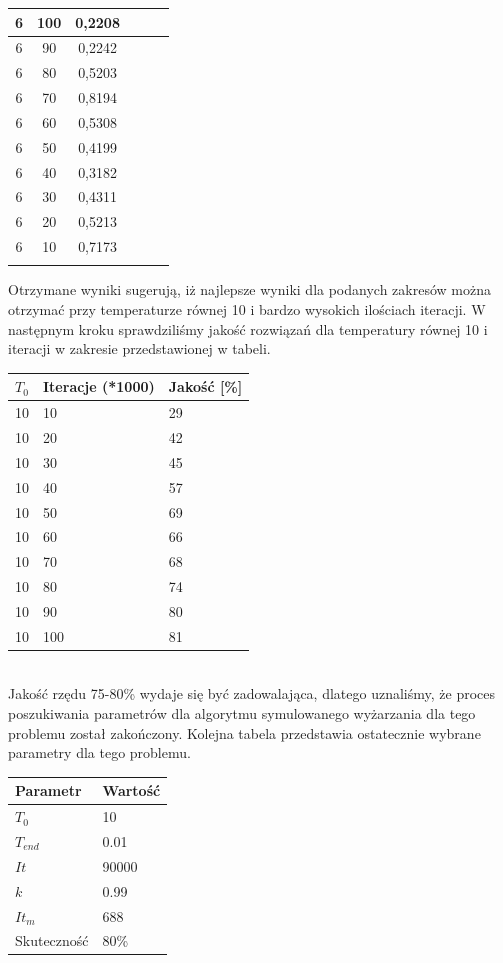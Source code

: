\documentclass[twoside]{projektInzynierskiMS1}
\newcommand{\si}{ś}
\begin{document}
\begin{table}[htbp]
\begin{tabular}{|c|c|c||c|c|c|}
6 & 100 & 0,2208 \\ \hline 
6 & 90 & 0,2242 \\ \hline 
6 & 80 & 0,5203 \\ \hline 
6 & 70 & 0,8194 \\ \hline 
6 & 60 & 0,5308 \\ \hline 
6 & 50 & 0,4199\\ \hline 
6 & 40 & 0,3182 \\ \hline 
6 & 30 & 0,4311 \\ \hline 
6 & 20 & 0,5213 \\ \hline 
6 & 10 & 0,7173 \\ \Xhline{3\arrayrulewidth}


\end{tabular} 
\end{table}

Otrzymane wyniki sugerują, iż najlepsze wyniki dla podanych zakresów można otrzymać przy temperaturze równej 10 i bardzo wysokich ilo\si ciach iteracji. W następnym kroku sprawdzili\si my jako\si ć rozwiązań dla temperatury równej 10 i iteracji w zakresie przedstawionej w tabeli. \\

\begin{tabularx}{\textwidth}{|X|X|X|} 
                  \hline
 \textbf{ $T_0$} & \textbf{Iteracje (*1000)}& \textbf{ Jako\si ć [\%]}\\ \hline
10 & 10 & 29 \\ \hline
10 & 20 & 42 \\ \hline
10 & 30 & 45 \\ \hline 
10 & 40 & 57 \\ \hline 
10 & 50 & 69 \\ \hline 
10 & 60 & 66 \\ \hline
10 & 70 & 68 \\ \hline 
10 & 80 & 74 \\ \hline 
10 & 90 &  80\\ \hline 
10 & 100 & 81 \\ \hline 
\end{tabularx} \\

Jako\si ć rzędu 75-80\% wydaje się być zadowalająca, dlatego uznali\si my, że proces poszukiwania parametrów dla algorytmu symulowanego wyżarzania dla tego problemu został zakończony. Kolejna tabela przedstawia ostatecznie wybrane parametry dla tego problemu. \\

\begin{tabularx}{\textwidth}{ |X|X|} 
\hline
 \textbf{ Parametr} & \textbf{ Warto\si ć}\\ \hline
 $T_0$ & 10 \\ \hline 
 $T_{end}$ & 0.01 \\ \hline 
 $It$ & 90000 \\ \hline
 $k$& 0.99 \\ \hline 
$It_m$ & 688 \\ \hline
 Skuteczno\si ć & 80\% \\ \hline 
\end{tabularx}
\end{document}
